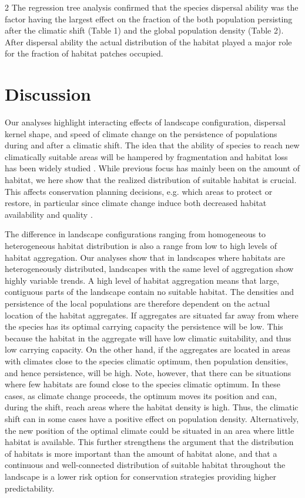 \documentclass[12pt,pdftex]{article}
\begin{document}
\begin{spacing}{2}
The regression tree analysis confirmed that the species dispersal ability was the factor having the largest effect on the fraction of the both population persisting after the climatic shift (Table 1) and the global population density (Table 2). After dispersal ability the actual distribution of the habitat played a major role for the fraction of habitat patches occupied. 


\section*{Discussion}

Our analyses highlight interacting effects of landscape configuration, dispersal kernel shape, and speed of climate change on the persistence of populations during and after a climatic shift. The idea that the ability of species to reach new  climatically suitable areas will be hampered by fragmentation and habitat loss has been widely studied \citep{Thomas2004}. While previous focus has mainly been on the amount of habitat, we here show that the realized distribution of suitable habitat is crucial. This affects conservation planning decisions, e.g. which areas to protect or restore, in particular since climate change induce both decreased habitat availability and quality \citep{Martin2016}.


The difference in landscape configurations ranging from homogeneous to heterogeneous habitat distribution is also a range from low to high levels of habitat aggregation. Our analyses show that in landscapes where habitats are heterogeneously distributed, landscapes with the same level of aggregation show highly variable trends. A high level of habitat aggregation means that large, contiguous parts of the landscape contain no suitable habitat. The densities and persistence of the local populations are therefore dependent on the actual location of the habitat aggregates. If aggregates are situated far away from where the species has its optimal carrying capacity the persistence will be low. This because the habitat in the aggregate will have low climatic suitability, and thus low carrying capacity. On the other hand, if the aggregates are located in areas with climates close to the species climatic optimum, then population densities, and hence persistence, will be high. Note, however, that there can be situations where few habitats are found close to the species climatic optimum. In these cases, as climate change proceeds, the optimum moves its position and can, during the shift, reach areas where the habitat density is high. Thus, the climatic shift can in some cases have a positive effect on population density. Alternatively, the new position of the optimal climate could be situated in an area where little habitat is available. This further strengthens the argument that the distribution of habitats is more important than the amount of habitat alone, and that a continuous and well-connected distribution of suitable habitat throughout the landscape is a lower risk option for conservation strategies providing higher predictability. 



\end{spacing}
\end{document}
